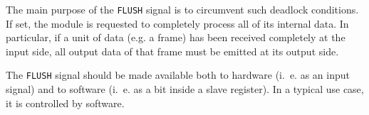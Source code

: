 The main purpose of the \texttt{FLUSH} signal is to circumvent such deadlock conditions. If set, the module is requested to completely process all of its internal data. In particular, if a unit of data (e.g. a frame) has been received completely at the input side, all output data of that frame must be emitted at its output side.

The \texttt{FLUSH} signal should be made available both to hardware (i.~e. as an input signal) and to software (i.~e. as a bit inside a slave register). In a typical use case, it is controlled by software.
